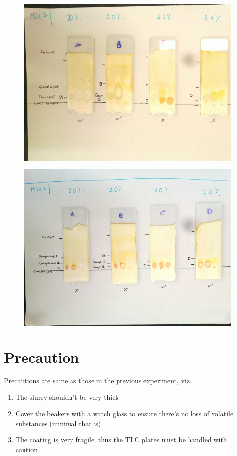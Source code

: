	\begin{figure}[bth]
		\begin{center}
			\includegraphics[width=1.2\linewidth]{gfx/e2_mix1}
		\end{center}
	\caption[TLC plates for Mixture 1]{\label{2_mix1}}
	\end{figure}
	\begin{figure}[bth]
		\begin{center}
			\includegraphics[width=1.2\linewidth]{gfx/e2_mix2}
		\end{center}
	\caption[TLC plates for Mixture 2]{\label{2_mix2}}
	\end{figure}

\section{Precaution}
	Precautions are same as those in the previous experiment, viz.
	\begin{enumerate}
		\item The slurry shouldn't be very thick
		\item Cover the beakers with a watch glass to ensure there's no loss of volatile substances (minimal that is)
		\item The coating is very fragile, thus the TLC plates must be handled with caution
	\end{enumerate}	
